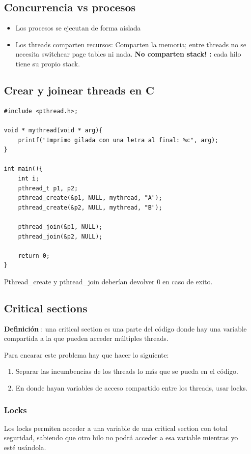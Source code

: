 \documentclass[a4paper]{article}
\begin{document}
\subsection{Concurrencia vs procesos}

\begin{itemize}
\item Los procesos se ejecutan de forma aislada
\item Los threads comparten recursos:
\subitem Comparten la memoria; entre threads no se necesita switchear page tables ni nada.
\subitem \textbf{No comparten stack! :} cada hilo tiene su propio stack. 
\end{itemize}

\subsection{Crear y joinear threads en C}
\begin{lstlisting}
#include <pthread.h>;

void * mythread(void * arg){
	printf("Imprimo gilada con una letra al final: %c", arg);
}

int main(){
	int i;
	pthread_t p1, p2;
	pthread_create(&p1, NULL, mythread, "A");
	pthread_create(&p2, NULL, mythread, "B");
	
	pthread_join(&p1, NULL);
	pthread_join(&p2, NULL);
	
	return 0;
}
\end{lstlisting}

Pthread\_create y pthread\_join deberían devolver 0 en caso de exito.

\subsection{Critical sections}
\textbf{Definición} : una critical section es una parte del código donde hay una variable compartida a la que pueden acceder múltiples threads.

Para encarar este problema hay que hacer lo siguiente:
\begin{enumerate}
\item Separar las incumbencias de los threads lo más que se pueda en el código.
\item En donde hayan variables de acceso compartido entre los threads, usar locks.
\end{enumerate}

\subsubsection{Locks}
Los locks permiten acceder a una variable de una critical section con total seguridad, sabiendo que otro hilo no podrá acceder a esa variable mientras yo esté usándola. 
\end{document}
